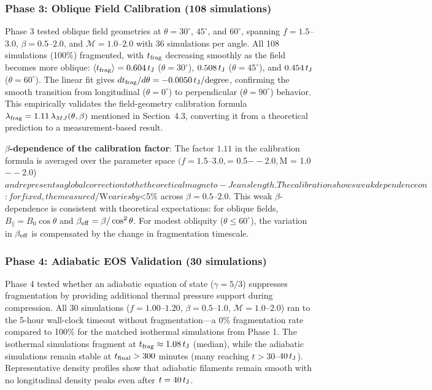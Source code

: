 \documentclass[twocolumn,longtitle,usenatbib]{mnras}
\begin{document}
\subsubsection{Phase 3: Oblique Field Calibration (108 simulations)}

Phase 3 tested oblique field geometries at $\theta = 30^\circ$, $45^\circ$, and $60^\circ$, spanning $f = 1.5$--$3.0$, $\beta = 0.5$--$2.0$, and $\mathcal{M} = 1.0$--$2.0$ with 36 simulations per angle. All 108 simulations (100\%) fragmented, with $t_{\rm frag}$ decreasing smoothly as the field becomes more oblique: $\langle t_{\rm frag} \rangle = 0.604\,t_{\rm J}$ ($\theta = 30^\circ$), $0.508\,t_{\rm J}$ ($\theta = 45^\circ$), and $0.454\,t_{\rm J}$ ($\theta = 60^\circ$). The linear fit gives $dt_{\rm frag}/d\theta = -0.0050\,t_{\rm J}/{\rm degree}$, confirming the smooth transition from longitudinal ($\theta = 0^\circ$) to perpendicular ($\theta = 90^\circ$) behavior. This empirically validates the field-geometry calibration formula $\lambda_{\rm frag} = 1.11\,\lambda_{MJ}(\theta, \beta)$ mentioned in Section~4.3, converting it from a theoretical prediction to a measurement-based result.

\textbf{$\beta$-dependence of the calibration factor}: The factor $1.11$ in the calibration formula is averaged over the parameter space $(f = 1.5$--$3.0, $\beta = 0.5$--$2.0$, ${\cal M} = 1.0$--$2.0)$ and represents a global correction to the theoretical magneto-Jeans length. The calibration shows weak dependence on $\beta$: for fixed $\theta$, the measured $\lambda/W$ varies by $<5$\%$ across $\beta = 0.5$--$2.0$. This weak $\beta$-dependence is consistent with theoretical expectations: for oblique fields, $B_{\parallel} = B_0 \cos\theta$ and $\beta_{\rm eff} = \beta / \cos^2\theta$. For modest obliquity ($\theta \leq 60^\circ$), the variation in $\beta_{\rm eff}$ is compensated by the change in fragmentation timescale.


\subsubsection{Phase 4: Adiabatic EOS Validation (30 simulations)}

Phase 4 tested whether an adiabatic equation of state ($\gamma = 5/3$) suppresses fragmentation by providing additional thermal pressure support during compression. All 30 simulations ($f = 1.00$--$1.20$, $\beta = 0.5$--$1.0$, $\mathcal{M} = 1.0$--$2.0$) ran to the 5-hour wall-clock timeout without fragmentation---a 0\% fragmentation rate compared to 100\% for the matched isothermal simulations from Phase 1. The isothermal simulations fragment at $t_{\rm frag} \approx 1.08\,t_{\rm J}$ (median), while the adiabatic simulations remain stable at $t_{\rm final} > 300$ minutes (many reaching $t > 30$--$40\,t_{\rm J}$). Representative density profiles show that adiabatic filaments remain smooth with no longitudinal density peaks even after $t = 40\,t_{\rm J}$.
\end{document}

